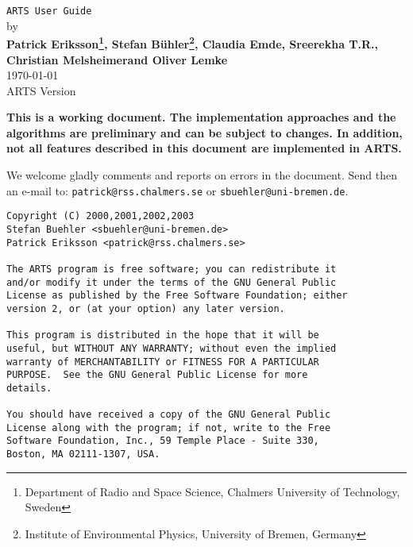 







%
%
\renewcommand{\thepage}{title \arabic{page}} 

\thispagestyle{plain}
\begin{center}
  \vspace*{2cm}
  {\Huge \verb|ARTS User Guide|\\}
  \vspace*{1cm}
  {\large by \\}
  \vspace*{1cm}
  {\large \bf Patrick Eriksson\footnote{Department of
    Radio and Space Science, Chalmers University of Technology, Sweden},
    Stefan B\"uhler\footnote{Institute of Environmental
      Physics, University of Bremen, Germany},   
    Claudia Emde\footnotemark[2], Sreerekha T.R.\footnotemark[2],\\ 
    Christian Melsheimer\footnotemark[2] and Oliver Lemke\footnotemark[2] 
    }\\
   \vspace*{2cm}
   {\large \today\\
    ARTS Version 
   }
\end{center}
  \vspace*{4cm}
{\normalsize \bf
  \noindent
  This is a working document. The implementation approaches and the
  algorithms are preliminary and can be subject to changes. In addition,
  not all features described in this document are implemented in ARTS.
  
  We welcome gladly comments and reports on errors in the document.
  Send then an e-mail to: \verb|patrick@rss.chalmers.se| or 
  \verb|sbuehler@uni-bremen.de|.
}

\newpage                          
\thispagestyle{empty}
\vspace*{\fill}
\noindent
\begin{verbatim}
Copyright (C) 2000,2001,2002,2003 
Stefan Buehler <sbuehler@uni-bremen.de>
Patrick Eriksson <patrick@rss.chalmers.se>

The ARTS program is free software; you can redistribute it
and/or modify it under the terms of the GNU General Public
License as published by the Free Software Foundation; either
version 2, or (at your option) any later version.

This program is distributed in the hope that it will be
useful, but WITHOUT ANY WARRANTY; without even the implied
warranty of MERCHANTABILITY or FITNESS FOR A PARTICULAR
PURPOSE.  See the GNU General Public License for more
details. 

You should have received a copy of the GNU General Public
License along with the program; if not, write to the Free
Software Foundation, Inc., 59 Temple Place - Suite 330,
Boston, MA 02111-1307, USA. 
\end{verbatim}
\cleardoublepage

